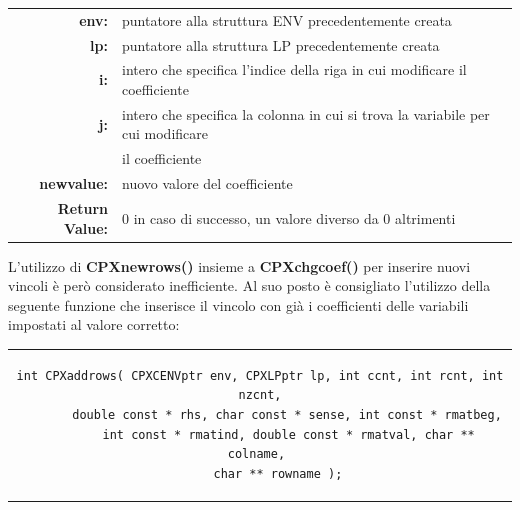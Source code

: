 \begin{table}[h]
\centering
\begin{tabular}{rl}
\textbf{env:} & {puntatore alla struttura ENV precedentemente creata}\\
\textbf{lp:} & {puntatore alla struttura LP precedentemente creata}\\
\textbf{i:} & {intero che specifica l'indice della riga in cui modificare il coefficiente}\\
\textbf{j:} & {intero che specifica la colonna in cui si trova la variabile per cui modificare}\\
&{il coefficiente}\\
\textbf{newvalue:} & {nuovo valore del coefficiente}\\
\textbf{Return Value:} & {0 in caso di successo, un valore diverso da 0 altrimenti}\\
\end{tabular}
\end{table}
L'utilizzo di \textbf{CPXnewrows()} insieme a \textbf{CPXchgcoef()} per inserire nuovi vincoli è però considerato inefficiente. Al suo posto è consigliato l'utilizzo della seguente funzione che inserisce il vincolo con già i coefficienti delle variabili impostati al valore corretto:
\begin{center}
\begin{tabular}{c}
\begin{lstlisting}[linewidth=400pt, basicstyle=\footnotesize\sffamily,]  
int CPXaddrows( CPXCENVptr env, CPXLPptr lp, int ccnt, int rcnt, int nzcnt,
		double const * rhs, char const * sense, int const * rmatbeg, 
		int const * rmatind, double const * rmatval, char ** colname, 
		char ** rowname );   
\end{lstlisting}
\end{tabular}
\end{center}
